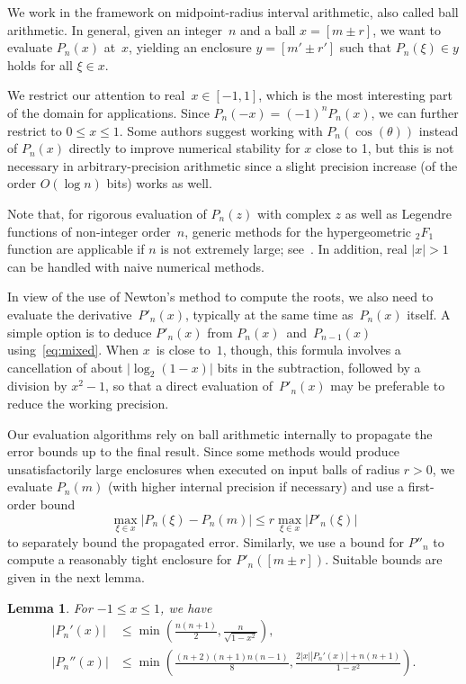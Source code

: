 \documentclass[11pt,a4paper]{article}
\newtheorem{lemma}[theorem]{Lemma}
\newcommand{\abs}[1]{\mathopen| #1 \mathclose|}
\begin{document}
We work in the framework on midpoint-radius interval arithmetic,
also called ball arithmetic.
In general, given an integer~$n$ and a ball $x = [m \pm r]$,
we want to evaluate $P_n(x)$ at~$x$,
yielding an enclosure $y = [m' \pm r']$ such that $P_n(\xi) \in y$
holds for all $\xi \in x$.

We restrict our attention to real~$x \in [-1, 1]$,
which is the most interesting part of the domain for applications.
Since $P_n(-x) = (-1)^n P_n(x)$, we can further
restrict to $0 \le x \le 1$.
Some authors suggest working with $P_n(\cos(\theta))$ instead of $P_n(x)$
directly to improve numerical stability for $x$ close to 1, but
this is not necessary in arbitrary-precision arithmetic since
a slight precision increase (of the order $O(\log n)$ bits)
works as well.

Note that, for rigorous evaluation of $P_n(z)$ with complex $z$
as well as Legendre functions of non-integer order $n$,
generic methods for the hypergeometric ${}_2F_1$ function
are applicable if $n$ is not extremely large; see~\cite{johansson2016hypergeometric}.
In addition, real $|x| > 1$ can be handled with naive numerical methods.

In view of the use of Newton's method to compute the roots,
we also need to evaluate the derivative $P'_n(x)$,
typically at the same time as $P_n(x)$ itself.
A simple option is to deduce $P'_n(x)$ from
$P_n(x)$ and $P_{n-1}(x)$ using \eqref{eq:mixed}.
When $x$ is close to $1$, though, this formula involves a
cancellation of about $\abs{\log_2(1 - x)}$ bits in the subtraction,
followed by a division by $x^2 - 1$, so that a direct evaluation
of $P'_n(x)$ may be preferable to reduce the working precision.

Our evaluation algorithms rely on ball arithmetic internally to
propagate the error bounds up to the final result.
Since some methods would produce unsatisfactorily large enclosures
when executed on input balls of radius $r > 0$, we evaluate $P_n(m)$
(with higher internal precision if necessary) and use a first-order
bound
\[ \max_{\xi \in x} |P_n(\xi) - P_n(m)|
   \le r \max_{\xi \in x} |P'_n(\xi)| \]
to separately bound the propagated error.
Similarly, we use a bound for $P''_n$ to compute a reasonably
tight enclosure for $P'_n([m \pm r])$.
Suitable bounds are given in the next lemma.

\begin{lemma} \label{lemma:prop-bound}
For $-1 \leq x \leq 1$, we have
\begin{align}
\label{eq:prop-bound}
  |P_n'(x)| &\le \min\left(\frac{n(n+1)}{2},
                          \frac{n}{\sqrt{1-x^2}}\right), \\
\label{eq:prop-bound1}
  |P_n''(x)| &\le \min\left(\frac{(n+2)(n+1)n(n-1)}{8},
                           \frac{2|x||P_n'(x)| + n(n+1)}{1-x^2}\right).
\end{align}
\end{lemma}
\end{document}
